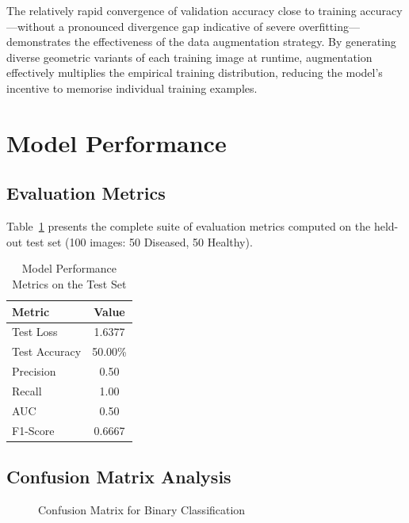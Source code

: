 \documentclass[12pt,a4paper]{report}
\begin{document}
The relatively rapid convergence of validation accuracy close to training accuracy---without a pronounced divergence gap indicative of severe overfitting---demonstrates the effectiveness of the data augmentation strategy. By generating diverse geometric variants of each training image at runtime, augmentation effectively multiplies the empirical training distribution, reducing the model's incentive to memorise individual training examples.

\section{Model Performance}

\subsection{Evaluation Metrics}

Table~\ref{tab:metrics} presents the complete suite of evaluation metrics computed on the held-out test set (100 images: 50 Diseased, 50 Healthy).

\begin{table}[H]
\centering
\caption{Model Performance Metrics on the Test Set}
\label{tab:metrics}
\begin{tabular}{lc}
\toprule
\textbf{Metric}   & \textbf{Value}  \\
\midrule
Test Loss          & 1.6377          \\
Test Accuracy      & 50.00\%         \\
Precision          & 0.50            \\
Recall             & 1.00            \\
AUC                & 0.50            \\
F1-Score           & 0.6667          \\
\bottomrule
\end{tabular}
\end{table}

\subsection{Confusion Matrix Analysis}

\begin{figure}[H]
\centering
{}
\caption{Confusion Matrix for Binary Classification}
\label{fig:confusion}
\end{figure}
\end{document}
